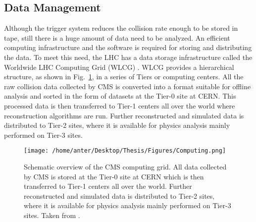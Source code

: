 \subsection{Data Management}
Although the trigger system reduces the collision rate enough to be stored in tape, still there is a huge amount of data need to be analyzed. An efficient computing infrastructure and the software is required for storing and distributing the data. To meet this need, the LHC has a data storage infrastructure called the Worldwide LHC Computing Grid (WLCG) \cite{Bird:2005js}. WLCG provides a hierarchical structure, as shown in Fig.~\ref{fig:Computing}, in a series of Tiers or computing centers. All the raw collision data collected by CMS is converted into a format suitable for offline analysis and sorted in the form of datasets at the Tier-0 site at CERN. This processed data is then transferred to Tier-1 centers all over the world where reconstruction algorithms are run. Further reconstructed and simulated data is distributed to Tier-2 sites, where it is available for physics analysis mainly performed on Tier-3 sites. %

\begin{figure}[!h]
\begin{center}
\vspace*{3mm} 
\hspace*{-5mm}
\texttt{[image: /home/anter/Desktop/Thesis/Figures/Computing.png]}\\
\vspace*{4mm}
\caption{Schematic overview of the CMS computing grid. All data collected by CMS is stored at the Tier-0 site at CERN which is then transferred to Tier-1 centers all over the world. Further reconstructed and simulated data is distributed to Tier-2 sites, where it is available for physics analysis mainly performed on Tier-3 sites. Taken from \cite{Bird:2005js}.}
\label{fig:Computing}
\end{center}
\end{figure}


